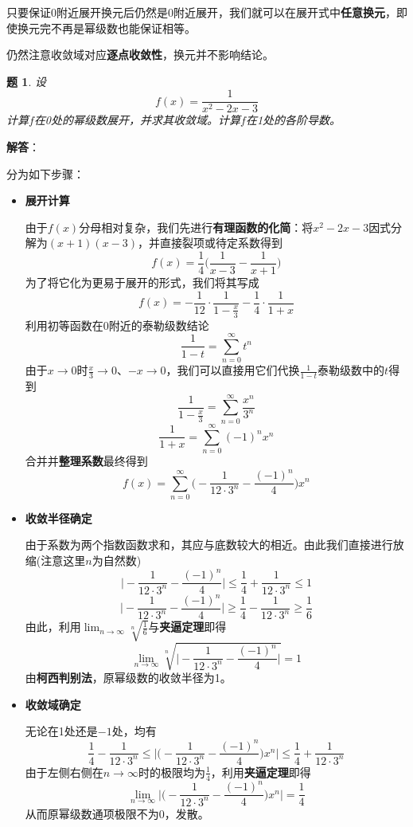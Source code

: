 \documentclass[a4paper,UTF8,fontset=windows,AutoFakeBold]{ctexart}
\newcommand*{\suminf}[1][n=1]{\sum_{#1}^\infty}
\newcommand*{\note}{\noindent *}
\theoremstyle{ex}
\newtheorem{exercise}{题}
\newcommand{\sol}[1]{{\vspace{5pt}\kaishu\noindent\textbf{解答}：\vspace{-3pt}
\begin{compactitem}
    \item[] #1
\end{compactitem}
}}
\begin{document}
\note 只要保证0附近展开换元后仍然是0附近展开，我们就可以在展开式中\textbf{任意换元}，即使换元完不再是幂级数也能保证相等。

\note 仍然注意收敛域对应\textbf{逐点收敛性}，换元并不影响结论。

\begin{framed}
\begin{exercise}
    设
    $$f(x)=\frac{1}{x^2-2x-3}$$
    计算$f$在0处的幂级数展开，并求其收敛域。计算$f$在1处的各阶导数。
\end{exercise}
\sol{
    分为如下步骤：
    \begin{itemize}
        \item \textbf{展开计算}
        
        由于$f(x)$分母相对复杂，我们先进行\textbf{有理函数的化简}：将$x^2-2x-3$因式分解为$(x+1)(x-3)$，并直接裂项或待定系数得到
        $$f(x)=\frac{1}{4}\bigg(\frac{1}{x-3}-\frac{1}{x+1}\bigg)$$
        为了将它化为更易于展开的形式，我们将其写成
        $$f(x)=-\frac{1}{12}\cdot\frac{1}{1-\frac{x}{3}}-\frac{1}{4}\cdot\frac{1}{1+x}$$
        利用初等函数在0附近的泰勒级数结论
        $$\frac{1}{1-t}=\suminf[n=0]t^n$$
        由于$x\to0$时$\frac{x}{3}\to0$、$-x\to0$，我们可以直接用它们代换$\frac{1}{1-t}$泰勒级数中的$t$得到
        $$\frac{1}{1-\frac{x}{3}}=\suminf[n=0]\frac{x^n}{3^n}$$
        $$\frac{1}{1+x}=\suminf[n=0](-1)^nx^n$$
        合并并\textbf{整理系数}最终得到
        $$f(x)=\suminf[n=0]\bigg(-\frac{1}{12\cdot3^n}-\frac{(-1)^n}{4}\bigg)x^n$$
        
        \item \textbf{收敛半径确定}
        
        由于系数为两个指数函数求和，其应与底数较大的相近。由此我们直接进行放缩(注意这里$n$为自然数)
        $$\bigg|-\frac{1}{12\cdot 3^n}-\frac{(-1)^n}{4}\bigg|\le\frac{1}{4}+\frac{1}{12\cdot3^n}\le1$$
        $$\bigg|-\frac{1}{12\cdot 3^n}-\frac{(-1)^n}{4}\bigg|\ge\frac{1}{4}-\frac{1}{12\cdot3^n}\ge\frac{1}{6}$$
        由此，利用$\lim_{n\to\infty}\sqrt[n]{\frac{1}{6}}$与\textbf{夹逼定理}即得
        $$\lim_{n\to\infty}\sqrt[n]{\bigg|-\frac{1}{12\cdot 3^n}-\frac{(-1)^n}{4}\bigg|}=1$$
        由\textbf{柯西判别法}，原幂级数的收敛半径为1。
        
        \item \textbf{收敛域确定}
        
        无论在1处还是$-1$处，均有
        $$\frac{1}{4}-\frac{1}{12\cdot3^n}\le\bigg|\bigg(-\frac{1}{12\cdot3^n}-\frac{(-1)^n}{4}\bigg)x^n\bigg|\le\frac{1}{4}+\frac{1}{12\cdot3^n}$$
        由于左侧右侧在$n\to\infty$时的极限均为$\frac{1}{4}$，利用\textbf{夹逼定理}即得
        $$\lim_{n\to\infty}\bigg|\bigg(-\frac{1}{12\cdot3^n}-\frac{(-1)^n}{4}\bigg)x^n\bigg|=\frac{1}{4}$$
        从而原幂级数通项极限不为0，发散。


\end{itemize}}
\end{framed}
\end{document}
